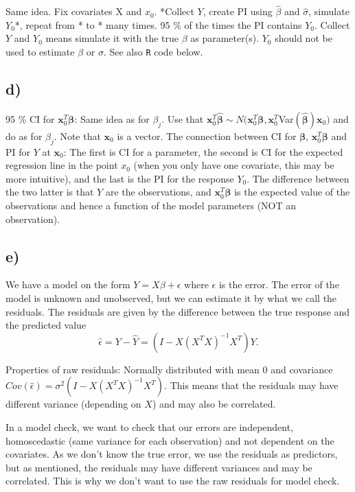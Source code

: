 \documentclass[]{article}
\begin{document}
Same idea. Fix covariates X and \(x_0\). *Collect \(Y\), create PI using
\(\hat{\beta}\) and \(\hat{\sigma}\), simulate \(Y_0\)*, repeat from *
to * many times. 95 \% of the times the PI contains \(Y_0\). Collect
\(Y\) and \(Y_0\) means simulate it with the true \(\beta\) as
parameter(s). \(Y_0\) should not be used to estimate \(\beta\) or
\(\sigma\). See also \texttt{R} code below.

\subsection{d)}\label{d}

95 \% CI for \(\mathbf{x}_0^T\mathbf{\beta}\): Same idea as for
\(\beta_j\). Use that
\(\mathbf{x}_0^T\hat{\mathbf{\beta}} \sim N(\mathbf{x}_0^T\mathbf{\beta}, \mathbf{x}_0^T\)Var\((\hat{\mathbf{\beta}})\mathbf{x}_0)\)
and do as for \(\beta_j\). Note that \(\mathbf{x}_0\) is a vector. The
connection between CI for \(\mathbf{\beta}\),
\(\mathbf{x}_0^T\mathbf{\beta}\) and PI for \(Y\) at \(\mathbf{x}_0\):
The first is CI for a parameter, the second is CI for the expected
regression line in the point \(x_0\) (when you only have one covariate,
this may be more intuitive), and the last is the PI for the response
\(Y_0\). The difference between the two latter is that \(Y\) are the
observations, and \(\mathbf{x}_0^T\mathbf{\beta}\) is the expected value
of the observations and hence a function of the model parameters (NOT an
observation).

\subsection{e)}\label{e}

We have a model on the form \(Y=X \beta + \epsilon\) where \(\epsilon\)
is the error. The error of the model is unknown and unobserved, but we
can estimate it by what we call the residuals. The residuals are given
by the difference between the true response and the predicted value
\[\hat{\epsilon}=Y-\hat{Y}=(I-X(X^TX)^{-1}X^T)Y.\]

Properties of raw residuals: Normally distributed with mean 0 and
covariance \(Cov(\hat{\epsilon})=\sigma^2 (I-X(X^TX)^{-1}X^T).\) This
means that the residuals may have different variance (depending on
\(X\)) and may also be correlated.

In a model check, we want to check that our errors are independent,
homoscedastic (same variance for each observation) and not dependent on
the covariates. As we don't know the true error, we use the residuals as
predictors, but as mentioned, the residuals may have different variances
and may be correlated. This is why we don't want to use the raw
residuals for model check.
\end{document}
